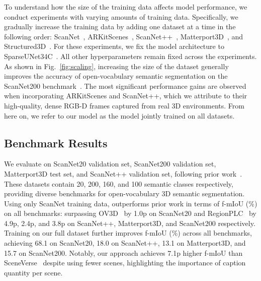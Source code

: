 To understand how the size of the training data affects model performance, we conduct experiments with varying amounts of training data.
Specifically, we gradually increase the training data by adding one dataset at a time in the following order: ScanNet~\cite{dai2017scannet}, ARKitScenes~\cite{baruch2021arkitscenes}, ScanNet++~\cite{yeshwanth2023scannet++}, Matterport3D~\cite{chang2017matterport3d}, and Structured3D~\cite{zheng2020structured3d}.
For these experiments, we fix the model architecture to SparseUNet34C~\cite{mink}.
All other hyperparameters remain fixed across the experiments.
As shown in Fig.~\ref{fig:scaling}, increasing the size of the dataset generally improves the accuracy of open-vocabulary semantic segmentation on the ScanNet200 benchmark~\cite{scannet200}.
The most significant performance gains are observed when incorporating ARKitScenes and ScanNet++, which we attribute to their high-quality, dense RGB-D frames captured from real 3D environments. 
From here on, we refer to our \nickname model as the model jointly trained on all datasets.







\subsection{Benchmark Results}
\label{subsec:benchmark}

We evaluate on ScanNet20 validation set, ScanNet200 validation set, Matterport3D test set, and ScanNet++ validation set, following prior work~\cite{Peng2023OpenScene,ding2022pla,yang2024regionplc,jiang2024open}.
These datasets contain 20, 200, 160, and 100 semantic classes respectively, providing diverse benchmarks for open-vocabulary 3D semantic segmentation.
Using only ScanNet training data, \nickname outperforms prior work in terms of f-mIoU (\%) on all benchmarks: surpassing OV3D~\cite{jiang2024open} by 1.0p on ScanNet20 and RegionPLC~\cite{yang2024regionplc} by 4.9p, 2.4p, and 3.8p on ScanNet++, Matterport3D, and ScanNet200 respectively.
Training on our full dataset \dataname further improves f-mIoU (\%) across all benchmarks, achieving 68.1 on ScanNet20, 18.0 on ScanNet++, 13.1 on Matterport3D, and 15.7 on ScanNet200.
Notably, our approach achieves 7.1p higher f-mIoU than SceneVerse~\cite{jiaSceneVerseScaling3D2024} despite using fewer scenes, highlighting the importance of caption quantity per scene.


